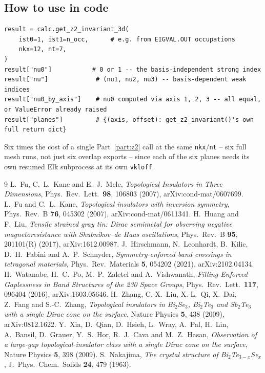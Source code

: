 \documentclass[11pt]{article}
\begin{document}
\subsection{How to use in code}

\begin{verbatim}
result = calc.get_z2_invariant_3d(
    ist0=1, ist1=n_occ,      # e.g. from EIGVAL.OUT occupations
    nkx=12, nt=7,
)
result["nu0"]           # 0 or 1 -- the basis-independent strong index
result["nu"]             # (nu1, nu2, nu3) -- basis-dependent weak indices
result["nu0_by_axis"]    # nu0 computed via axis 1, 2, 3 -- all equal, or ValueError already raised
result["planes"]         # {(axis, offset): get_z2_invariant()'s own full return dict}
\end{verbatim}
Six times the cost of a single Part~\ref{part:z2} call at the same \texttt{nkx}/\texttt{nt}
-- six full mesh runs, not just six overlap exports -- since each of the six planes
needs its own resumed Elk subprocess at its own \texttt{vkloff}.

\begin{thebibliography}{9}
L.~Fu, C.~L.~Kane and E.~J.~Mele,
\emph{Topological Insulators in Three Dimensions},
Phys.\ Rev.\ Lett.\ \textbf{98}, 106803 (2007), arXiv:cond-mat/0607699.
L.~Fu and C.~L.~Kane,
\emph{Topological insulators with inversion symmetry},
Phys.\ Rev.\ B \textbf{76}, 045302 (2007), arXiv:cond-mat/0611341.
H.~Huang and F.~Liu,
\emph{Tensile strained gray tin: Dirac semimetal for observing negative
magnetoresistance with Shubnikov--de Haas oscillations},
Phys.\ Rev.\ B \textbf{95}, 201101(R) (2017), arXiv:1612.00987.
J.~Hirschmann, N.~Leonhardt, B.~Kilic, D.~H.~Fabini and A.~P.~Schnyder,
\emph{Symmetry-enforced band crossings in tetragonal materials},
Phys.\ Rev.\ Materials \textbf{5}, 054202 (2021), arXiv:2102.04134.
H.~Watanabe, H.~C.~Po, M.~P.~Zaletel and A.~Vishwanath,
\emph{Filling-Enforced Gaplessness in Band Structures of the 230 Space Groups},
Phys.\ Rev.\ Lett.\ \textbf{117}, 096404 (2016), arXiv:1603.05646.
H.~Zhang, C.-X.~Liu, X.-L.~Qi, X.~Dai, Z.~Fang and S.-C.~Zhang,
\emph{Topological insulators in Bi$_2$Se$_3$, Bi$_2$Te$_3$ and Sb$_2$Te$_3$ with a
single Dirac cone on the surface},
Nature Physics \textbf{5}, 438 (2009), arXiv:0812.1622.
Y.~Xia, D.~Qian, D.~Hsieh, L.~Wray, A.~Pal, H.~Lin, A.~Bansil, D.~Grauer, Y.~S.~Hor,
R.~J.~Cava and M.~Z.~Hasan,
\emph{Observation of a large-gap topological-insulator class with a single Dirac cone
on the surface},
Nature Physics \textbf{5}, 398 (2009).
S.~Nakajima,
\emph{The crystal structure of Bi$_2$Te$_{3-x}$Se$_x$},
J.\ Phys.\ Chem.\ Solids \textbf{24}, 479 (1963).
\end{thebibliography}
\end{document}
